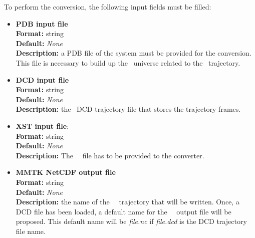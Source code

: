 \documentclass[a4paper,11pt]{report}
\begin{document}
To perform the conversion, the following input fields must be filled:
\begin{itemize}
\item \textbf{PDB input file}\\
\textbf{Format:} string\\
\textbf{Default:} \textit{None}\\
\textbf{Description:} a PDB file of the system must be provided for the conversion. This file is necessary to build up 
the \MMTK\ universe related to the \MMTK\ trajectory. 

\item \textbf{DCD input file}\\
\textbf{Format:} string\\
\textbf{Default:} \textit{None}\\
\textbf{Description:} the \CHARMM\ DCD trajectory file that stores the trajectory frames.

\item \textbf{XST input file}:\\
\textbf{Format:} string\\
\textbf{Default:} \textit{None}\\
\textbf{Description:} The \NAMD\ \XST\ file has to be provided to the converter.

\item \textbf{MMTK NetCDF output file}\\
\textbf{Format:} string\\
\textbf{Default:} \textit{None}\\
\textbf{Description:} the name of the \MMTK\ \NetCDF\ trajectory that will be written. Once, a DCD file has been 
loaded, a default name for the \MMTK\ \NetCDF\ output file will be proposed. This default name will be 
\textit{file.nc} if \textit{file.dcd} is the DCD trajectory file name.
\end{itemize}
\end{document}
